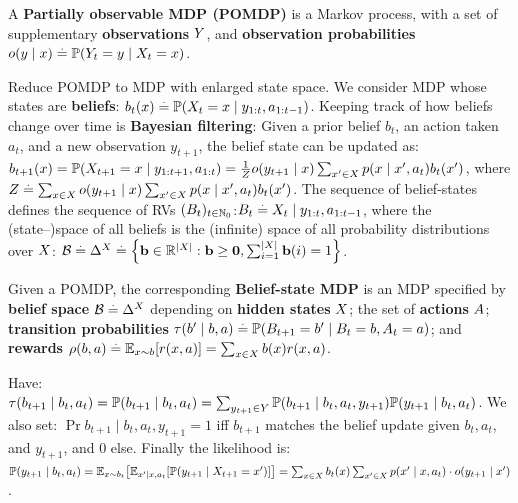 \begin{framed}
    A \textbf{Partially observable MDP (POMDP)} is a Markov process, with a set of supplementary \textbf{observations} $\sY$, and \textbf{observation probabilities} $o(y \mid x) \defeq \Pr{Y_t = y \mid X_t = x}$.
\end{framed}
Reduce POMDP to MDP with enlarged state space. We consider MDP whose states are \textbf{beliefs}: $b_t(x) \defeq \Pr{X_t = x \mid y_{1:t}, a_{1:t-1}}$. Keeping track of how beliefs change over time is \textbf{Bayesian filtering}: Given a prior belief $b_t$, an action taken $a_t$, and a new observation $y_{t+1}$, the belief state can be updated as: $b_{t+1}(x) = \Pr{X_{t+1} = x \mid y_{1:t+1}, a_{1:t}} = \frac{1}{Z} o(y_{t+1} \mid x) \sum_{x' \in \sX} p(x \mid x', a_t) b_t(x')$, where $Z \defeq \sum_{x \in \sX} o(y_{t+1} \mid x) \sum_{x' \in \sX} p(x \mid x', a_t) b_t(x')$.
The sequence of belief-states defines the sequence of RVs $(B_t)_{t\in\Nat_0}$:$ B_t \defeq X_t \mid y_{1:t}, a_{1:t-1}$, where the (state--)space of all beliefs is the (infinite) space of all probability distributions over $\sX$: $\spB \defeq \Delta^{\sX} \defeq \braces*{\vb \in \R^{\card{\sX}} : \vb \geq \vzero, \textstyle\sum_{i=1}^{\card{\sX}} \vb(i) = 1}$.
\begin{framed}
    Given a POMDP, the corresponding \textbf{Belief-state MDP} is an MDP specified by \textbf{belief space} $\spB \defeq \Delta^{\sX}$ depending on \textbf{hidden states} $\sX$; the set of \textbf{actions} $\sA$; \textbf{transition probabilities} $\tau(b' \mid b, a) \defeq \Pr{B_{t+1} = b' \mid B_t = b, A_t = a}$; and \textbf{rewards} $\rho(b, a) \defeq \E[x \sim b]{r(x, a)} = \sum_{x \in \sX} b(x) r(x, a)$.
\end{framed}
Have: $\tau(b_{t+1} \mid b_t, a_t) = \Pr{b_{t+1} \mid b_t, a_t} = \sum_{y_{t+1} \in \sY} \Pr{b_{t+1} \mid b_t, a_t, y_{t+1}} \Pr{y_{t+1} \mid b_t, a_t}$. We also set: $\Pr{b_{t+1} \mid b_t, a_t, y_{t+1}} = 1$ iff $b_{t+1}$ matches the belief update given $b_t, a_t$, and $y_{t+1}$, and 0 else. Finally the likelihood is: $\Pr{y_{t+1} \mid b_t, a_t} = \E[x \sim b_t]{\E[x' \mid x, a_t]{\Pr{y_{t+1} \mid X_{t+1} = x'}}} = \sum_{x \in \sX} b_t(x) \sum_{x' \in \sX} p(x' \mid x, a_t) \cdot o(y_{t+1} \mid x')$.